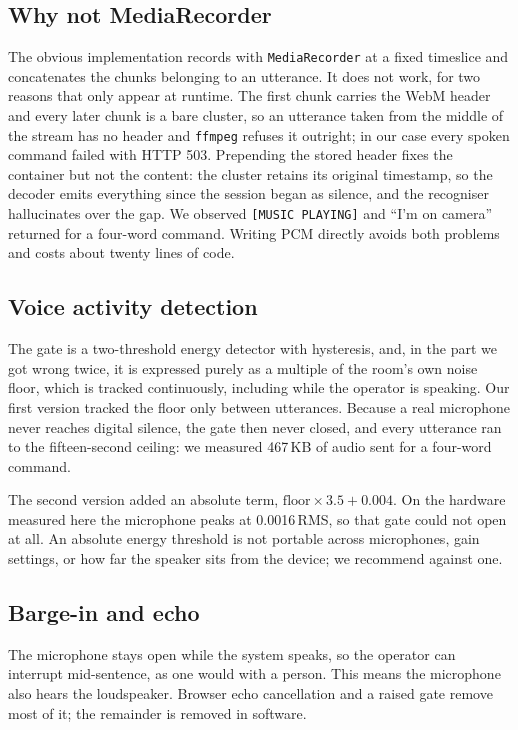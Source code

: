 \documentclass[conference]{IEEEtran}
\begin{document}
\subsection{Why not MediaRecorder}
The obvious implementation records with \texttt{MediaRecorder} at a fixed
timeslice and concatenates the chunks belonging to an utterance. It does not
work, for two reasons that only appear at runtime. The first chunk carries the
WebM header and every later chunk is a bare cluster, so an utterance taken from
the middle of the stream has no header and \texttt{ffmpeg} refuses it outright;
in our case every spoken command failed with HTTP 503. Prepending the stored
header fixes the container but not the content: the cluster retains its
original timestamp, so the decoder emits everything since the session began as
silence, and the recogniser hallucinates over the gap. We observed
\texttt{[MUSIC PLAYING]} and ``I'm on camera'' returned for a four-word
command. Writing PCM directly avoids both problems and costs about twenty lines
of code.

\subsection{Voice activity detection}
The gate is a two-threshold energy detector with hysteresis, and, in the part we got wrong
twice, it is expressed purely as a multiple of the room's
own noise floor, which is tracked continuously, including while the operator is
speaking. Our first version tracked the floor only between utterances. Because
a real microphone never reaches digital silence, the gate then never closed,
and every utterance ran to the fifteen-second ceiling: we measured 467\,KB of
audio sent for a four-word command.

The second version added an absolute term, $\text{floor} \times 3.5 + 0.004$.
On the hardware measured here the microphone peaks at 0.0016\,RMS, so that gate
could not open at all. An absolute energy threshold is not portable across
microphones, gain settings, or how far the speaker sits from the device; we
recommend against one.

\subsection{Barge-in and echo}
The microphone stays open while the system speaks, so the operator can
interrupt mid-sentence, as one would with a person. This means the microphone
also hears the loudspeaker. Browser echo cancellation and a raised gate remove
most of it; the remainder is removed in software.
\end{document}
